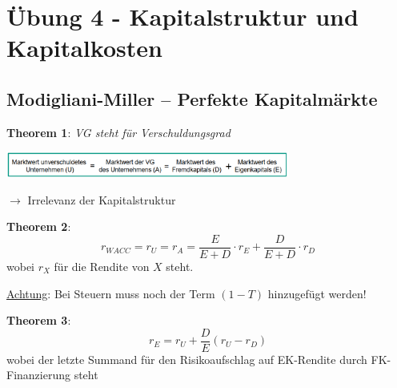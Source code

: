 \section{Übung 4 - Kapitalstruktur und Kapitalkosten}

\subsection{Modigliani-Miller – Perfekte Kapitalmärkte}

\textbf{Theorem 1}: \textit{VG steht für Verschuldungsgrad}
\begin{center}
	\includegraphics[width=0.7\textwidth]{images/e7.png}
\end{center}
$\rightarrow$ Irrelevanz der Kapitalstruktur

\textbf{Theorem 2}: 
$$r_{WACC}=r_U=r_A=\frac{E}{E+D}\cdot r_E+\frac{D}{E+D}\cdot r_D$$
wobei $r_X$ für die Rendite von $X$ steht.

\underline{Achtung}: Bei Steuern muss noch der Term $(1-T)$ hinzugefügt werden!

\textbf{Theorem 3}:
$$r_E=r_U+\frac{D}{E}(r_U-r_D)$$
wobei der letzte Summand für den Risikoaufschlag auf EK-Rendite durch FK-Finanzierung steht
